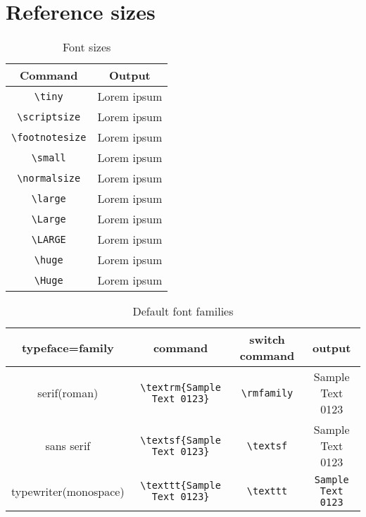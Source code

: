 \section{Reference sizes}

\begin{table}[h]
\caption{Font sizes}
\begin{tabular}{cc}
\hline \textbf{Command} & \textbf{Output} \\ 
\hline \lstinline[language={[LaTeX]TeX}]|\tiny| & \tiny Lorem ipsum \\ 
\hline \lstinline[language={[LaTeX]TeX}]|\scriptsize| & \scriptsize Lorem ipsum \\ 
\hline \lstinline[language={[LaTeX]TeX}]|\footnotesize| & \footnotesize Lorem ipsum \\ 
\hline \lstinline[language={[LaTeX]TeX}]|\small| & \small Lorem ipsum \\ 
\hline \lstinline[language={[LaTeX]TeX}]|\normalsize| & \normalsize Lorem ipsum \\ 
\hline \lstinline[language={[LaTeX]TeX}]|\large| & \large Lorem ipsum \\ 
\hline \lstinline[language={[LaTeX]TeX}]|\Large| & \Large Lorem ipsum \\ 
\hline \lstinline[language={[LaTeX]TeX}]|\LARGE| & \LARGE Lorem ipsum \\ 
\hline \lstinline[language={[LaTeX]TeX}]|\huge| & \huge Lorem ipsum \\ 
\hline \lstinline[language={[LaTeX]TeX}]|\Huge| & \Huge Lorem ipsum \\ 
\hline 
\end{tabular} 
\end{table}

\begin{table}[h]
\caption{Default font families}
\begin{tabular}{cccc}
\hline \textbf{typeface=family} & \textbf{command} & \textbf{switch command} & \textbf{output} \\ 
\hline serif(roman) & \lstinline[language={[LaTeX]TeX}]|\textrm{Sample Text 0123}| & \lstinline[language={[LaTeX]TeX}]|\rmfamily| & \textrm{Sample Text 0123} \\ 
\hline sans serif & \lstinline[language={[LaTeX]TeX}]|\textsf{Sample Text 0123}| & \lstinline[language={[LaTeX]TeX}]|\textsf| & \textsf{Sample Text 0123} \\ 
\hline typewriter(monospace) & \lstinline[language={[LaTeX]TeX}]|\texttt{Sample Text 0123}| & \lstinline[language={[LaTeX]TeX}]|\texttt| & \texttt{Sample Text 0123} \\ 
\hline 
\end{tabular} 
\end{table}

